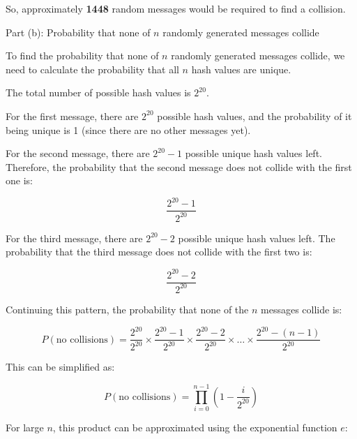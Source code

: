 \documentclass{article}
\begin{document}
                            So, approximately \textbf{1448} random messages would be required to find a collision.
                            
                            Part (b): Probability that none of \( n \) randomly generated messages collide
                            
                            To find the probability that none of \( n \) randomly generated messages collide, we need to calculate the probability that all \( n \) hash values are unique.
                            
                            The total number of possible hash values is \( 2^{20} \).
                            
                            For the first message, there are \( 2^{20} \) possible hash values, and the probability of it being unique is 1 (since there are no other messages yet).
                            
                            For the second message, there are \( 2^{20} - 1 \) possible unique hash values left. Therefore, the probability that the second message does not collide with the first one is:
                            
                            \[ \frac{2^{20} - 1}{2^{20}} \]
                            
                            For the third message, there are \( 2^{20} - 2 \) possible unique hash values left. The probability that the third message does not collide with the first two is:
                            
                            \[ \frac{2^{20} - 2}{2^{20}} \]
                            
                            Continuing this pattern, the probability that none of the \( n \) messages collide is:
                            
                            \[ P(\text{no collisions}) = \frac{2^{20}}{2^{20}} \times \frac{2^{20} - 1}{2^{20}} \times \frac{2^{20} - 2}{2^{20}} \times \ldots \times \frac{2^{20} - (n - 1)}{2^{20}} \]
                            
                            This can be simplified as:
                            
                            \[ P(\text{no collisions}) = \prod_{i=0}^{n-1} \left(1 - \frac{i}{2^{20}}\right) \]
                            
                            For large \( n \), this product can be approximated using the exponential function \( e \):
                            
\end{document}
